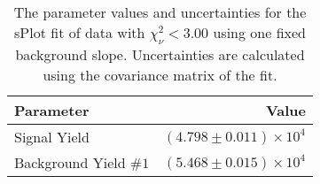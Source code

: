 
\begin{table}[ht]
    \begin{center}
        \begin{tabular}{lr}\toprule
            Parameter & Value \\\midrule
            Signal Yield & $(4.798 \pm 0.011) \times 10^{4}$ \\
            Background Yield $\#1$ & $(5.468 \pm 0.015) \times 10^{4}$ \\\bottomrule
        \end{tabular}
        \caption{The parameter values and uncertainties for the sPlot fit of data with $\chi^2_\nu < 3.00$ using one fixed background slope. Uncertainties are calculated using the covariance matrix of the fit.}\label{tab:splot-fit-results-chisqdof-3.00-fixed-1}
    \end{center}
\end{table}
